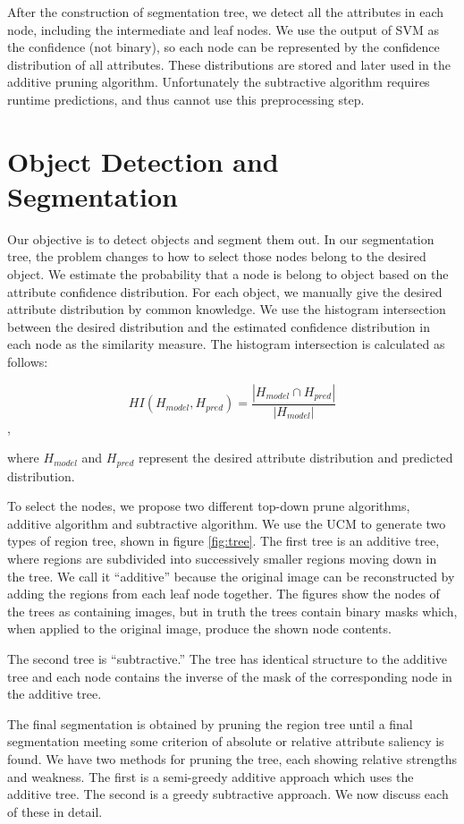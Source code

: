 \documentclass[10pt,twocolumn,letterpaper]{article}
\begin{document}
After the construction of segmentation tree, we detect all
the attributes in each node, including the intermediate and
leaf nodes. We use the output of SVM as the confidence (not binary),
so each node can be represented by the confidence distribution of
all attributes.  These distributions are stored and later used in
the additive pruning algorithm.  Unfortunately the subtractive algorithm
requires runtime predictions, and thus cannot use this preprocessing
step.



\section{Object Detection and Segmentation}
\label{sec:detection}

Our objective is to detect objects and segment them out. In our
segmentation tree, the problem changes to how to select
those nodes belong to the desired object. We estimate the
probability that a node is belong to object based on the attribute
confidence distribution. For each object, we manually give the
desired attribute distribution by common knowledge. We use the
histogram intersection between the desired distribution and the
estimated confidence distribution in each node as the similarity
measure. The histogram intersection is calculated as follows:

\[ HI(H_{model},H_{pred}) = \frac{|H_{model} \cap H_{pred}|}{|H_{model}|}
\] ,

where $H_{model}$ and $H_{pred}$ represent the desired attribute
distribution and predicted distribution.

To select the nodes, we propose two different top-down prune algorithms, additive algorithm and subtractive algorithm. We use the UCM to generate two types of region tree, shown in figure \ref{fig:tree}.
The first tree is an additive tree, where regions are subdivided into successively
smaller regions moving down in the tree.  We call it ``additive'' because the
original image can be reconstructed by adding the regions from each leaf node
together.  The figures show the nodes of the trees as containing images, but in
truth the trees contain binary masks which, when applied to the original image,
produce the shown node contents.

The second tree is ``subtractive.''  The tree has identical structure to the additive
tree and each node contains the inverse of the mask of the corresponding node
in the additive tree.

The final segmentation is obtained by pruning the region tree until a final segmentation
meeting some criterion of absolute or relative attribute saliency is found.
We have two methods for pruning the tree, each showing relative strengths and
weakness.  The first is a semi-greedy additive approach which uses the additive
tree.  The second is a greedy subtractive approach.  We now discuss each of these
in detail.
\end{document}
